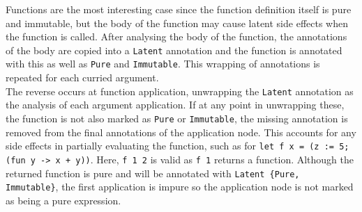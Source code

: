 Functions are the most interesting case since the function definition itself is pure and immutable, but the body of the function may cause latent side effects when the function is called. After analysing the body of the function, the annotations of the body are copied into a \verb|Latent| annotation and the function is annotated with this as well as \verb|Pure| and \verb|Immutable|. This wrapping of annotations is repeated for each curried argument. \\
The reverse occurs at function application, unwrapping the \verb|Latent| annotation as the analysis of each argument application. If at any point in unwrapping these, the function is not also marked as \verb|Pure| or \verb|Immutable|, the missing annotation is removed from the final annotations of the application node. This accounts for any side effects in partially evaluating the function, such as for \verb|let f x = (z := 5; (fun y -> x + y))|. Here, \verb|f 1 2| is valid as \verb|f 1| returns a function. Although the returned function is pure and will be annotated with \verb|Latent {Pure, Immutable}|, the first application is impure so the application node is not marked as being a pure expression.





